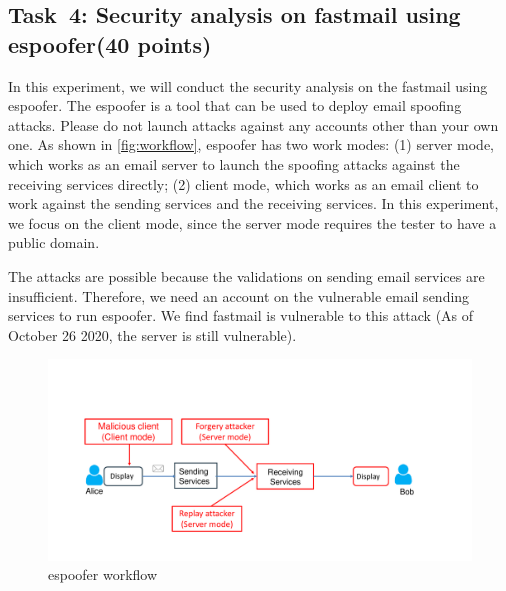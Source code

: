 \documentclass[11pt]{article}
\newcommand{\espoofer}{{\sf espoofer}\xspace}
\begin{document}
\subsection{Task~4: Security analysis on \textsf{fastmail} using \espoofer (40 points)}

In this experiment, we will conduct the security analysis on the \textsf{fastmail} using \espoofer. The \espoofer is a tool that can be used to deploy email spoofing attacks. Please do not launch attacks against any accounts other than your own one.  As shown in \autoref{fig:workflow}, \espoofer has two work modes: (1) server mode, which works as an email server to launch the spoofing attacks against the receiving services directly; (2) client mode, which works as an email client to work against the sending services and the  receiving services. In this experiment, we focus on the client mode, since the server mode requires the tester to have a public domain.



The attacks are possible because the validations on sending email services are insufficient. Therefore, we need an account on the vulnerable email sending services to run \espoofer.  We find \textsf{fastmail} is vulnerable to this attack (As of October 26 2020, the server is still vulnerable).

\begin{figure} [h]
\centering
\vspace{-2mm}
\includegraphics[width=0.88\columnwidth]{espoofer}

\caption{\espoofer workflow}\label{fig:workflow}
\end{figure}
\end{document}
